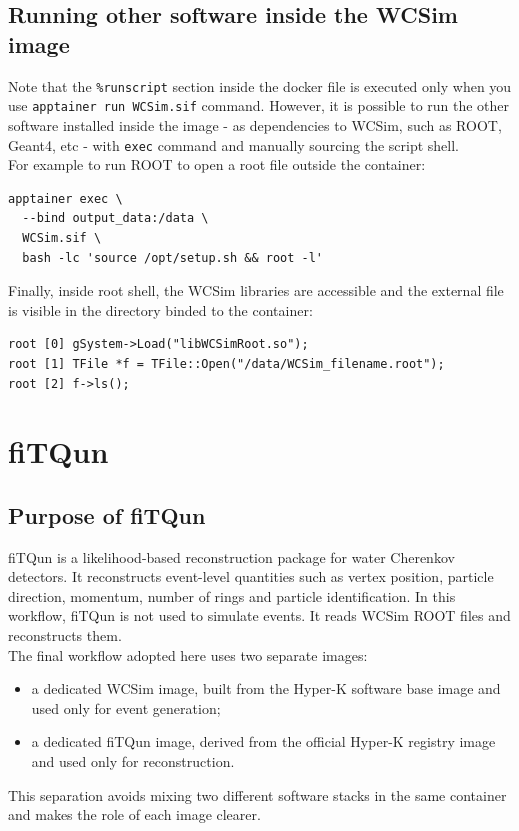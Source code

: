 \documentclass{article}
\numberwithin{table}{subsection}
\numberwithin{figure}{subsection}
\numberwithin{equation}{subsection}
\numberwithin{footnote}{subsection}
\begin{document}
\subsection{Running other software inside the WCSim image}
Note that the \texttt{\%runscript} section inside the docker file is executed only when you use \texttt{apptainer run WCSim.sif} command. However, it is possible to run the other software installed inside the image - as dependencies to WCSim, such as ROOT, Geant4, etc - with \texttt{exec} command and manually sourcing the script shell.\\
For example to run ROOT to open a root file outside the container:
\begin{lstlisting}[style=terminal]
apptainer exec \
  --bind output_data:/data \
  WCSim.sif \
  bash -lc 'source /opt/setup.sh && root -l'
\end{lstlisting}
Finally, inside root shell, the WCSim libraries are accessible and the external file is visible in the directory binded to the container:
\begin{lstlisting}[style=terminal]
root [0] gSystem->Load("libWCSimRoot.so");
root [1] TFile *f = TFile::Open("/data/WCSim_filename.root");
root [2] f->ls();
\end{lstlisting}

\section{fiTQun}
\label{sec:fitqun}

\subsection{Purpose of fiTQun}

fiTQun is a likelihood-based reconstruction package for water Cherenkov detectors. It reconstructs event-level quantities such as vertex position, particle direction, momentum, number of rings and particle identification. In this workflow, fiTQun is not used to simulate events. It reads WCSim ROOT files and reconstructs them.\\
The final workflow adopted here uses two separate images:
\begin{itemize}
    \item a dedicated WCSim image, built from the Hyper-K software base image and used only for event generation;
    \item a dedicated fiTQun image, derived from the official Hyper-K registry image and used only for reconstruction.
\end{itemize}
This separation avoids mixing two different software stacks in the same container and makes the role of each image clearer.
\end{document}

